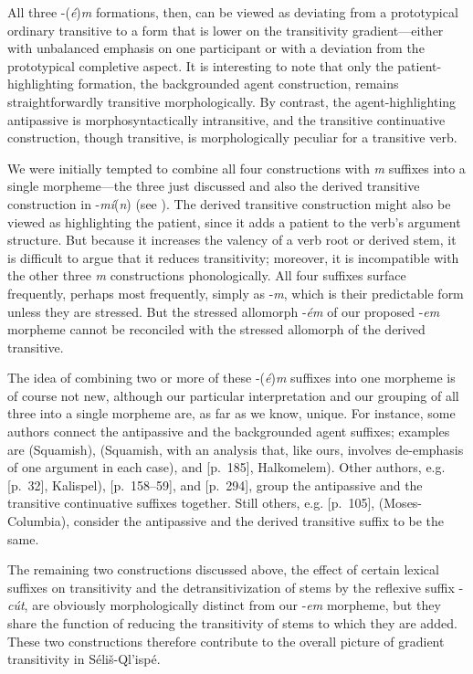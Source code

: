 \documentclass[output=paper,colorlinks,citecolor=brown]{langscibook}
\begin{document}
All three -(\emph{\'e})\emph{m}  formations, then, can be viewed as
 deviating from a prototypical ordinary transitive to a form that is
 lower on the transitivity gradient---either with unbalanced emphasis
 on one participant or with a deviation from the prototypical
 completive aspect.  It is interesting to note that only the
 patient-highlighting formation, the backgrounded agent construction,
 remains straightforwardly transitive morphologically.  By contrast,
 the agent-highlighting antipassive is morphosyntactically
 intransitive, and the transitive continuative construction, though
 transitive, is morphologically peculiar for a transitive verb.


We were initially tempted to combine all four constructions with
\emph{m} suffixes into a single morpheme---the three just discussed
and also the derived transitive construction in -\emph{m\'i}(\emph{n})
(see \cite{S.Thomason&Everett:1993}).  The derived transitive
construction might also be viewed as highlighting the patient, since
it adds a patient to the verb's argument structure.  But because it
increases the valency of a verb root or derived stem, it is difficult
to argue that it reduces transitivity; moreover, it is incompatible
with the other three \emph{m} constructions phonologically.  All four
suffixes surface frequently, perhaps most frequently, simply as
-\emph{m}, which is their predictable form unless they are stressed.
But the stressed allomorph -\emph{\'em} of our proposed -\emph{em}
morpheme cannot be reconciled with the stressed allomorph of the
derived transitive.

The idea of combining two or more of these -(\emph{\'e})\emph{m}
 suffixes into one morpheme is of course not new, although our
 particular interpretation and our grouping of all three into a
 single morpheme are, as far as we know, unique.  For instance, some
 authors connect the antipassive and the backgrounded agent suffixes;
 examples are \cite{Kuipers:1967} (Squamish), \cite{Darnell:1990}
 (Squamish, with an analysis that, like ours, involves de-emphasis of
 one argument in each case), and \cite{Gerdts:1989}[p.~185],
 Halkomelem).  Other authors, e.g. \cite{Vogt:1940}[p.~32],
 Kalispel), \cite{Newman:1980}[p.~158--59], and
 \cite{Kroeber:1991}[p.~294], group the antipassive and the
 transitive continuative suffixes together.  Still others,
 e.g. \cite{Kinkade:1981}[p.~105], (Moses-Columbia), consider the
 antipassive and the derived transitive suffix to be the same.

The remaining two constructions discussed above, the effect of certain
lexical suffixes on transitivity and the detransitivization of stems
by the reflexive suffix -\emph{c\'ut}, are obviously morphologically
distinct from our -\emph{em} morpheme, but they share the function of
reducing the transitivity of stems to which they are added.  These two
constructions therefore contribute to the overall picture of gradient
transitivity in S\'eli\v{s}-Ql'isp\'e.
\end{document}
